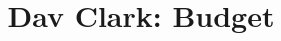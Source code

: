 \documentclass[12pt]{scrartcl}
\begin{document}
\title{Dav Clark: Budget}
\maketitle
\end{document}

